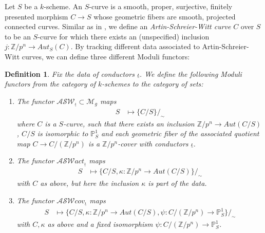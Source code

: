 \documentclass{compositio}
\newcommand{\mat}[1]{\todo[color=green]{MH: #1}}
\newtheorem{definition}[theorem]{Definition}
\theoremstyle{remark}
\theoremstyle{remark}
\DeclareMathOperator{\cov}{cov}
\begin{document}
Let $S$ be a $k$-scheme. An $S$-curve is a smooth, proper, surjective, finitely presented morphism $C \xrightarrow{} S$ whose geometric fibers are smooth, projected connected curves. Similar as in  \cite{MR2985514}, we define an \textit{Artin-Schreier-Witt curve} $C$ over $S$ to be an $S$-curve for which there exists an (unspecified) inclusion $j: \mathbb{Z}/p^n \to Aut_S(C)$. By tracking different data associated to Artin-Schreier-Witt curves, we can define three different Moduli functors:
 \begin{definition}
 Fix the data of conductors $\underline{\iota}$. We define the following Moduli functors from the category of  $k$-schemes to the category of sets:
     \begin{enumerate}
         \item The functor $\mathcal{ASW}_{\underline{\iota}} \subset \mathcal{M}_g$ maps
         \begin{align}
              S & \mapsto \{ C/S \}/_{\sim}
         \end{align}
         where $C$ is a $S$-curve, such that there exists an inclusion $\mathbb{Z}/p^n \to Aut(C/S)$, $C/S$ is isomorphic to $\mathbb{P}^1_S$ and each geometric fiber of the associated quotient map $C \to C/(\mathbb{Z}/p^n)$ is a $\mathbb{Z}/p^n$-cover with conductors $\underline{\iota}$.
         \item The functor $\mathcal{ASW}act_{\underline{\iota}}$ maps
         \begin{align}
              S & \mapsto \{ C/S, \kappa:  \mathbb{Z}/p^n \to Aut(C/S) \}/_{\sim}
         \end{align}
         with $C$ as above, but here the inclusion $\kappa$ is part of the data.
         \item The functor $\mathcal{ASW}cov_{\underline{\iota}}$ maps
         \begin{align}
              S & \mapsto \{ C/S, \kappa:  \mathbb{Z}/p^n \to Aut(C/S), \psi: C/(\mathbb{Z}/p^n) \to \mathbb{P}^1_S \}/_{\sim}
         \end{align}
         with $C, \kappa$ as above and a fixed isomorphism $\psi:  C/(\mathbb{Z}/p^n) \to \mathbb{P}^1_S$.
     \end{enumerate}
 \end{definition}
\end{document}
